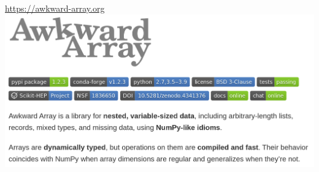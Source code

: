 \documentclass[aspectratio=169]{beamer}
\begin{document}
\begin{frame}{\href{https://awkward-array.org}{https://awkward-array.org}}
\vspace{0.5 cm}
\includegraphics[width=\linewidth]{awkward-array-org.png}
\end{frame}
\end{document}
